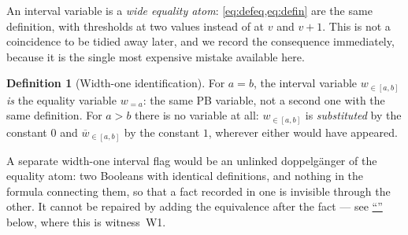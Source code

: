 \documentclass[11pt,a4paper]{article}
\theoremstyle{plain}
\theoremstyle{definition}
\newtheorem{definitionT}{Definition}
\theoremstyle{remark}
\newcommand{\ateq}[2]{#1_{= #2}}
\newcommand{\atin}[3]{#1_{\in[#2,#3]}}
\newcommand{\natin}[3]{\overline{#1}_{\in[#2,#3]}}
\newcommand{\nsec}[1]{\hyperref[#1]{``\nameref*{#1}''}}
\begin{document}
An interval variable is a \emph{wide equality atom}: \cref{eq:defeq,eq:defin}
are the same definition, with thresholds at two values instead of at $v$ and
$v+1$.  This is not a coincidence to be tidied away later, and we record the
consequence immediately, because it is the single most expensive mistake
available here.

\begin{definitionT}[Width-one identification]
\label{def:widthone}
For $a=b$, the interval variable $\atin{w}{a}{b}$ \emph{is} the equality
variable $\ateq{w}{a}$: the same PB variable, not a second one with the same
definition.  For $a>b$ there is no variable at all: $\atin{w}{a}{b}$ is
\emph{substituted} by the constant $0$ and $\natin{w}{a}{b}$ by the constant
$1$, wherever either would have appeared.
\end{definitionT}

A separate width-one interval flag would be an unlinked doppelg\"anger of the
equality atom: two Booleans with identical definitions, and nothing in the
formula connecting them, so that a fact recorded in one is invisible through
the other.  It cannot be repaired by adding the equivalence after the fact ---
see \nsec{sec:loadbearing} below, where this is witness~W1.
\end{document}
